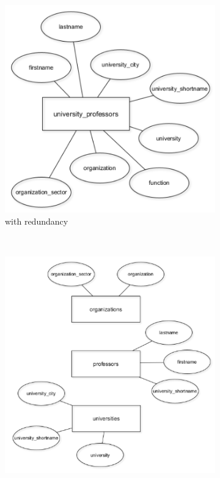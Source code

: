 \documentclass[11pt]{article}
\begin{document}
    \begin{figure}[hbt!]
        \centering
        \begin{subfigure}[t]{.48\textwidth}
            \centering
            \includegraphics[width=\columnwidth,trim=4 4 4 4,clip]{img/ent_rel_diag1.png}
            \caption{with redundancy}
            \label{fig:with_redun}
        \end{subfigure}
        ~ %
        \begin{subfigure}[t]{.48\textwidth}
            \centering
            \includegraphics[width=\columnwidth,trim=4 4 4 4,clip]{img/ent_rel_diag2.png}

\end{subfigure}
\end{figure}
\end{document}
